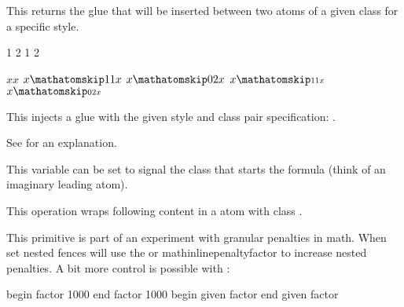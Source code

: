 \stopnewprimitive

\startnewprimitive[title={\prm {mathatomglue}}]

This returns the glue that will be inserted between two atoms of a given class
for a specific style.

\startbuffer
\the\mathatomglue {} 1
\the\mathatomglue {} 2
\the\mathatomglue {} 1
\the\mathatomglue {} 2
\stopbuffer

\typebuffer

\startlines \tttf
\getbuffer
\stoplines

\stopnewprimitive

\startnewprimitive[title={\prm {mathatomskip}}]

\startbuffer
$x x$
$x \mathatomskip \textstyle   1 1 x$
$x \mathatomskip \textstyle   0 2 x$
$x \mathatomskip \scriptstyle 1 1 x$
$x \mathatomskip \scriptstyle 0 2 x$
\stopbuffer

This injects a glue with the given style and class pair specification:
\inlinebuffer.

\typebuffer


\stopnewprimitive

\startnewprimitive[title={\prm {mathbackwardpenalties}}]

See  for an explanation.

\stopnewprimitive

\startnewprimitive[title={\prm {mathbeginclass}}]

This variable can be set to signal the class that starts the formula (think of an
imaginary leading atom).

\stopnewprimitive

\startoldprimitive[title={\prm {mathbin}}]

This operation wraps following content in a atom with class .

\stopoldprimitive

\startnewprimitive[title={\prm {mathboundary}}]

This primitive is part of an experiment with granular penalties in math. When set
nested fences will use the  or \prm
{mathinlinepenaltyfactor} to increase nested penalties. A bit more control is
possible with :

\starttabulate[||||]
 \NC begin \NC factor 1000  \NC \NR
{} \NC end   \NC factor 1000  \NC \NR
{} \NC begin \NC given factor \NC \NR
{} \NC end   \NC given factor \NC \NR
\stoptabulate


